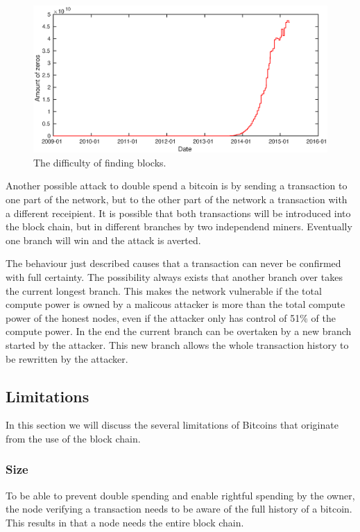 \begin{figure}
        \centerline{\includegraphics[scale=0.5]{relatedWork/figs/difficulty/difficulty.eps}}
	\caption{The difficulty of finding blocks.}
	\label{fig:hash-difficulty}
\end{figure}

Another possible attack to double spend a bitcoin is by sending a transaction to one part of the network,
but to the other part of the network a transaction with a different receipient.
It is possible that both transactions will be introduced into the block chain, but in different branches by two independend miners.
Eventually one branch will win and the attack is averted.

The behaviour just described causes that a transaction can never be confirmed with full certainty.
The possibility always exists that another branch over takes the current longest branch.
This makes the network vulnerable if the total compute power is owned by a malicous attacker is more than the total compute power of the honest nodes,
even if the attacker only has control of 51\% of the compute power.
In the end the current branch can be overtaken by a new branch started by the attacker.
This new branch allows the whole transaction history to be rewritten by the attacker.

\subsection{Limitations}
In this section we will discuss the several limitations of Bitcoins
that originate from the use of the block chain.

\subsubsection{Size}
\label{bitcoin-limit-size}
To be able to prevent double spending and enable rightful spending by the owner,
the node verifying a transaction needs to be aware of the full history of a bitcoin.
This results in that a node needs the entire block chain.

